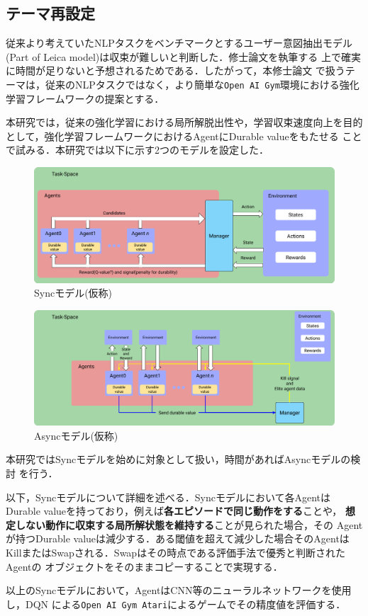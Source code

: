 \documentclass[11pt,a4paper]{jsarticle}
\begin{document}
\subsection{テーマ再設定}
従来より考えていたNLPタスクをベンチマークとするユーザー意図抽出モデル
(Part of Leica model)は収束が難しいと判断した．修士論文を執筆する
上で確実に時間が足りないと予想されるためである．したがって，本修士論文
で扱うテーマは，従来のNLPタスクではなく，より簡単な\texttt{Open AI
 Gym}環境における強化学習フレームワークの提案とする．\par
本研究では，従来の強化学習における局所解脱出性や，学習収束速度向上を目的
として，強化学習フレームワークにおけるAgentにDurable valueをもたせる
ことで試みる．本研究では以下に示す2つのモデルを設定した．
\begin{figure}[htbp]
  \begin{center}
    \includegraphics[width=14cm]{fig1.png}
    \caption{Syncモデル(仮称)}
  \end{center}
  \label{fig1}
\end{figure}
\begin{figure}[htbp]
  \begin{center}
    \includegraphics[width=14cm]{fig2.png}
    \caption{Asyncモデル(仮称)}
  \end{center}
  \label{fig2}
\end{figure}
本研究ではSyncモデルを始めに対象として扱い，時間があればAsyncモデルの検討
を行う．\par
以下，Syncモデルについて詳細を述べる．Syncモデルにおいて各AgentはDurable
valueを持っており，例えば\textbf{各エピソードで同じ動作をする}ことや，
\textbf{想定しない動作に収束する局所解状態を維持する}ことが見られた場合，その
Agentが持つDurable valueは減少する．ある閾値を超えて減少した場合そのAgentは
KillまたはSwapされる．Swapはその時点である評価手法で優秀と判断されたAgentの
オブジェクトをそのままコピーすることで実現する．\par
以上のSyncモデルにおいて，AgentはCNN等のニューラルネットワークを使用し，DQN
による\texttt{Open AI Gym Atari}によるゲームでその精度値を評価する．
\end{document}

